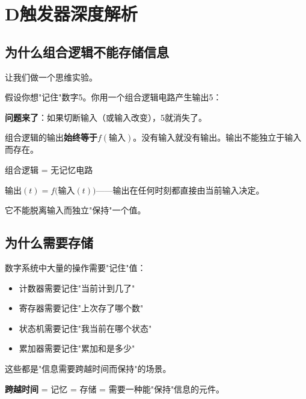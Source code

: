 \chapter{D触发器深度解析}

\section{为什么组合逻辑不能存储信息}

让我们做一个思维实验。

假设你想"记住"数字5。你用一个组合逻辑电路产生输出5：

\begin{center}
\end{center}

\textbf{问题来了}：如果切断输入（或输入改变），5就消失了。

组合逻辑的输出\textbf{始终等于}$f(\text{输入})$。没有输入就没有输出。输出不能独立于输入而存在。

\begin{keypoint}[组合逻辑的根本限制]
组合逻辑 = 无记忆电路

输出$(t) = f($输入$(t))$——输出在任何时刻都直接由当前输入决定。

它不能脱离输入而独立"保持"一个值。
\end{keypoint}

\section{为什么需要存储}

数字系统中大量的操作需要"记住"值：

\begin{itemize}
  \item 计数器需要记住"当前计到几了"
  \item 寄存器需要记住"上次存了哪个数"
  \item 状态机需要记住"我当前在哪个状态"
  \item 累加器需要记住"累加和是多少"
\end{itemize}

这些都是"信息需要跨越时间而保持"的场景。

\textbf{跨越时间} = 记忆 = 存储 = 需要一种能"保持"信息的元件。

